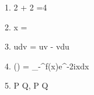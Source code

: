 1. 2 + 2 =4

2. \displaystyle x = 

3. \int udv = uv - \int vdu

4. (\xi) = \int_{-\infty}^\infty f(x)e^{-2\pi ix\xi}dx

5. P \rightarrow Q, P \vdash Q